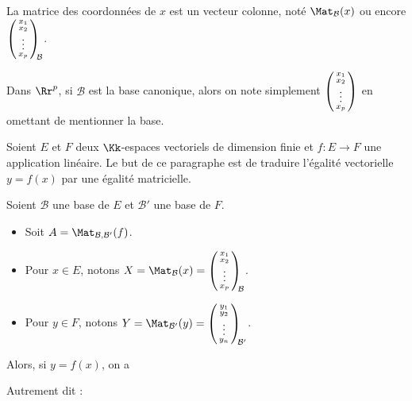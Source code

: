 \documentclass[class=report,crop=false]{standalone}
\begin{document}
La matrice  des coordonnées de $x$ est un vecteur colonne, noté $\Mat_\mathcal{B} (x)$
ou encore $\left(\begin{smallmatrix}x_1\cr x_2\cr \vdots \cr x_p\end{smallmatrix}\right)_{\!\!\mathcal{B}}$.

Dans $\Rr^p$, si $\mathcal{B}$ est la base canonique, alors on note
simplement $\left(\begin{smallmatrix}x_1\cr x_2\cr \vdots \cr x_p\end{smallmatrix}\right)$
en omettant de mentionner la base.


\bigskip



Soient $E$ et $F$ deux $\Kk$-espaces vectoriels de dimension finie
et  $f : E \to F$ une application linéaire.
Le but de ce paragraphe est de traduire l'égalité vectorielle
$y=f (x)$  par une égalité matricielle.

Soient $\mathcal{B}$ une base de $E$ et
$\mathcal{B}'$ une base de $F$.
\begin{proposition}
\label{prop:matetapplin}
\sauteligne
\begin{itemize}
  \item Soit $A = \Mat_{\mathcal{B},\mathcal{B}'} (f)$.

  \item Pour $x \in E$, notons $X = \Mat_{\mathcal{B}} (x) =
  \left(\begin{smallmatrix}x_1\cr x_2\cr \vdots \cr x_p\end{smallmatrix}\right)_{\!\!\mathcal{B}}$.

  \item Pour $y \in F$, notons $Y = \Mat_{\mathcal{B}'} (y) =
  \left(\begin{smallmatrix}y_1\cr y_2\cr \vdots \cr y_n\end{smallmatrix}\right)_{\!\!\mathcal{B}'}$.
\end{itemize}
Alors, si $y = f(x)$, on a

Autrement dit :
\end{proposition}
\end{document}
